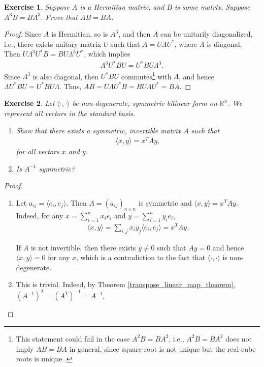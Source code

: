 \documentclass[10pt]{book}
\newtheorem{exercise}{Exercise}[section]
\theoremstyle{definition}
\numberwithin{equation}{chapter}
\begin{document}
\medskip

\begin{exercise}
Suppose $A$ is a Hermitian matrix, and $B$ is some matrix. Suppose $A^3B = BA^3$. Prove that $AB = BA$.
\end{exercise}
\begin{proof}
Since $A$ is Hermitian, so is $A^3$, and then $A$ can be unitarily diagonalized, i.e., there exists unitary matrix $U$ such that $A = U \Lambda U^*$, where $\Lambda$ is diagonal. Then $U \Lambda^3 U^*B = B U \Lambda^3 U^*$, which implies
\begin{align*}
    \Lambda^3 U^*B U = U^* B U \Lambda^3.
\end{align*}
Since $\Lambda^3$ is also diagonal, then $U^*B U$ commutes\footnote{This statement could fail in the case $A^2B = BA^2$, i.e., $A^2 B = B A^2$ does not imply $AB = BA$ in general, since square root is not unique but the real cube roots is unique {\rm \cite{41}}.} with $\Lambda$, and hence $\Lambda U^*B U = U^* B U \Lambda$. Thus, $AB = U \Lambda U^*B = B U \Lambda U^* = BA$.
\end{proof}

\medskip

\begin{exercise}
Let $\big\langle \cdot, \cdot\big\rangle$ be non-degenerate, symmetric bilinear form on $\mathbb{R}^n$. We represent all vectors in the standard basis.
\begin{enumerate}[label=(\alph*)]
    \item Show that there exists a symmetric, invertible matrix $A$ such that 
    \begin{align*}
        \big\langle x, y\big\rangle = x^T Ay,
    \end{align*}
    for all vectors $x$ and $y$.
    
    \item Is $A^{-1}$ symmetric?
\end{enumerate}
\end{exercise}
\begin{proof}
~\begin{enumerate}[label=(\alph*)]
    \item Let $a_{ij} = \big\langle e_i, e_j\big\rangle$. Then $A = \left(a_{ij}\right)_{n \times n}$ is symmetric and $\big\langle x, y\big\rangle = x^T Ay$. Indeed, for any $x = \sum^n_{i=1} x_i e_i$ and $y = \sum^n_{i=1} y_i e_i$,
    \begin{align*}
        \big\langle x, y\big\rangle = \sum_{i,j} x_i y_j \big\langle e_i, e_j\big\rangle = x^T Ay.
    \end{align*}
    
    If $A$ is not invertible, then there exists $y \neq 0$ such that $Ay = 0$ and hence $\big\langle x, y\big\rangle = 0$ for any $x$, which is a contradiction to the fact that $\big\langle \cdot, \cdot\big\rangle$ is non-degenerate.
    
    \item This is trivial. Indeed, by Theorem \ref{transpose_linear_map_theorem}, $\left(A^{-1}\right)^T = \left(A^T\right)^{-1} = A^{-1}$.
\end{enumerate}
\end{proof}
\end{document}
